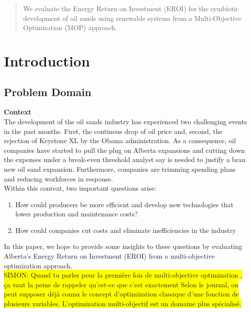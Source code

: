 \documentclass[12pt]{article}
\newcommand{\h}[1]{\colorbox{yellow}{#1}}
\begin{document}
\maketitle

\begin{abstract}
We evaluate the Energy Return on Investment (EROI) for the symbiotic development of oil sands using renewable systems  from a Multi-Objective Optimization (MOP) approach. 
\end{abstract}

\tableofcontents
\newpage

\section{Introduction}

\subsection{Problem Domain}

{\bf Context} \\

The development of the oil sands industry has experienced two challenging events in the past months. First, the continous drop of oil price and, second,  the rejection of Keystone XL by the Obama administration. As a consequence, oil companies have started to pull the plug on Alberta expansions and cutting down the expenses under a break-even threshold analyst say is needed to justify a bran new oil sand expansion. Furthermore, companies are trimming spending plans and reducing workforces in response.  \\

Within this context, two important questions arise: 
  \begin{enumerate}
  \item How could producers be more efficient and develop new technologies that lower production and maintenance costs?
  \item How could companies cut costs and eliminate inefficiencies in the industry
  \end{enumerate}

In this paper, we hope to provide some insights to these questions by evaluating Alberta's Energy Return on Investment (EROI) from a multi-objective optimization approach. \\

\h{SIMON: Quand tu parles pour la première fois de multi-objective optimization
, ça vaut la peine de rappeler qu'est-ce que c'est exactement Selon le
journal, on peut supposer déjà connu le concept d'optimization classique
 d'une fonction de plusieurs variables. L'optimization multi-objectif est un 
 domaine plus spécialisé.}
\end{document}
